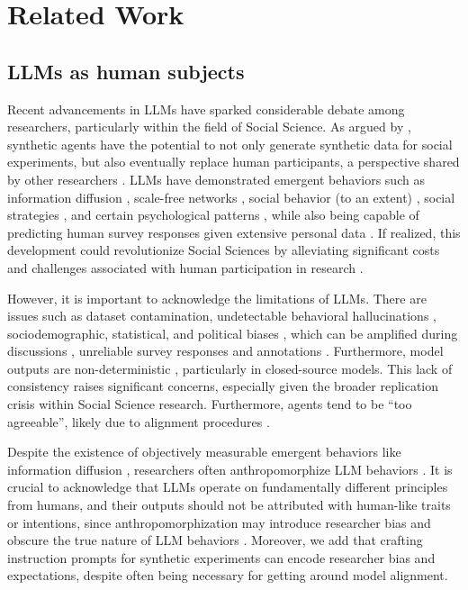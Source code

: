 %
\section{Related Work}

\subsection{LLMs as human subjects}
\label{ssec:related:human-llm}

Recent advancements in \acp{LLM} have sparked considerable debate among researchers, particularly within the field of Social Science. As argued by \citet{grossman_2023}, synthetic agents have the potential to not only generate synthetic data for social experiments, but also eventually replace human participants, a perspective shared by other researchers \cite{tornberg_2023, argyle2023}. \acp{LLM} have demonstrated emergent behaviors such as information diffusion \cite{Park2023GenerativeAI}, scale-free networks \cite{demarzo_2023}, social behavior (to an extent) \cite{leng_2024}, social strategies \cite{abdelnabi_negotiations}, and certain psychological patterns \cite{abramski_2023}, while also being capable of predicting human survey responses given extensive personal data \cite{park2024generativeagentsimulations1000}. If realized, this development could revolutionize Social Sciences by alleviating significant costs and challenges associated with human participation in research \cite{rossi_2024, shapiro2019polling}.

However, it is important to acknowledge the limitations of \acp{LLM}. There are issues such as dataset contamination, undetectable behavioral hallucinations \cite{rossi_2024}, sociodemographic, statistical, and political biases \cite{anthis_2025,hewitt2024predicting,rossi_2024}, which can be amplified during discussions \cite{Taubenfeld2024SystematicBI}, unreliable survey responses \cite{jansen_2023,bisbee_2023,neumann_2025} and annotations \cite{Gligoric2024CanUL}. Furthermore, model outputs are non-deterministic \cite{atil_2025}, particularly in closed-source models\cite{bisbee_2023}. This lack of consistency raises significant concerns, especially given the broader replication crisis within Social Science research. Furthermore, agents tend to be “too agreeable”, likely due to alignment procedures \cite{Park2023GenerativeAI, anthis_2025, rossi_2024}.

Despite the existence of objectively measurable emergent behaviors like information diffusion \cite{Park2023GenerativeAI}, researchers often anthropomorphize \ac{LLM} behaviors \cite{rossi_2024}. It is crucial to acknowledge that \acp{LLM} operate on fundamentally different principles from humans, and their outputs should not be attributed with human-like traits or intentions, since anthropomorphization may introduce researcher bias and obscure the true nature of \ac{LLM} behaviors \cite{anthis_2025,zhou-etal-2024-real}. Moreover, we add that crafting instruction prompts for synthetic experiments can encode researcher bias and expectations, despite often being necessary for getting around model alignment.


